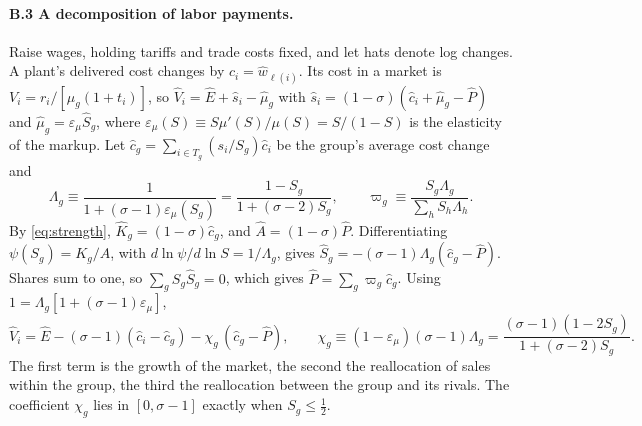 \documentclass[11pt]{article}
\begin{document}
\paragraph{B.3 A decomposition of labor payments.} Raise wages, holding tariffs and
trade costs fixed, and let hats denote log changes. A plant's delivered cost changes by
$\hat c_i=\hat w_{\ell(i)}$. Its cost in a market is $V_i=r_i/[\mu_g(1+t_i)]$, so
$\hat V_i=\hat E+\hat s_i-\hat\mu_g$ with $\hat s_i=(1-\sigma)(\hat c_i+\hat\mu_g-\hat P)$
and $\hat\mu_g=\varepsilon_\mu\hat S_g$, where $\varepsilon_\mu(S)\equiv
S\mu'(S)/\mu(S)=S/(1-S)$ is the elasticity of the markup. Let
$\hat c_g=\sum_{i\in T_g}(s_i/S_g)\hat c_i$ be the group's average cost change and
\[
  \Lambda_g\equiv\frac{1}{1+(\sigma-1)\varepsilon_\mu(S_g)}=\frac{1-S_g}{1+(\sigma-2)S_g},
  \qquad
  \varpi_g\equiv\frac{S_g\Lambda_g}{\sum_hS_h\Lambda_h}.
\]
By \eqref{eq:strength}, $\hat K_g=(1-\sigma)\hat c_g$, and $\hat A=(1-\sigma)\hat P$.
Differentiating $\psi(S_g)=K_g/A$, with $d\ln\psi/d\ln S=1/\Lambda_g$, gives
$\hat S_g=-(\sigma-1)\Lambda_g(\hat c_g-\hat P)$. Shares sum to one, so
$\sum_gS_g\hat S_g=0$, which gives $\hat P=\sum_g\varpi_g\hat c_g$. Using
$1=\Lambda_g[1+(\sigma-1)\varepsilon_\mu]$,
\begin{equation}
  \hat V_i=\hat E-(\sigma-1)(\hat c_i-\hat c_g)-\chi_g\,(\hat c_g-\hat P),
  \qquad
  \chi_g\equiv(1-\varepsilon_\mu)(\sigma-1)\Lambda_g
  =\frac{(\sigma-1)(1-2S_g)}{1+(\sigma-2)S_g} .
  \tag{B.3}\label{eq:vdecomp}
\end{equation}
The first term is the growth of the market, the second the reallocation of sales within
the group, the third the reallocation between the group and its rivals. The coefficient
$\chi_g$ lies in $[0,\sigma-1]$ exactly when $S_g\le\frac12$.
\end{document}
